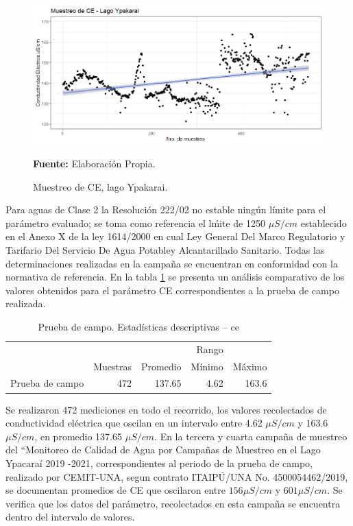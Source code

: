 \begin{figure}[H]
        \centering
        \includegraphics[width=0.75\linewidth]{Imagenes/cap4/CE_lago.png}
        \caption {Muestreo de CE, lago Ypakarai. }{\textbf{Fuente:}
        Elaboraci\'on Propia. }
        \label{fig:Lago_ce}
\end{figure}

Para aguas de Clase 2 la Resoluci\'on 222/02 no estable ningún l\'imite para el par\'ametro evaluado; se toma como referencia el l\'mite de 1250 $\mu S/cm$ establecido en el Anexo X de la ley 1614/2000 en cual Ley General Del Marco Regulatorio y Tarifario Del Servicio De Agua Potabley Alcantarillado Sanitario. Todas las determinaciones realizadas en la campa\~na se encuentran en conformidad con la normativa de referencia.
En la tabla \ref{table:Lago_ce} se presenta un an\'alisis comparativo de los valores obtenidos para el par\'ametro CE correspondientes a la prueba de campo  realizada.

\begin{table}[H]
\centering
\caption{Prueba de campo. Estadísticas descriptivas – ce}
\label{table:Lago_ce}
\begin{tabular}{lrrrr}
\toprule& 
\multicolumn{3}{r}{Rango} \\  \cline{4-5}& 
Muestras & Promedio & Mínimo & Máximo \\
\midrule
Prueba de campo  &      472 &   137.65 &   4.62 &  163.6 \\
\bottomrule
\end{tabular}
\end{table}

Se realizaron 472 mediciones en todo el recorrido, los valores recolectados de conductividad el\'ectrica que oscilan en  un intervalo entre 4.62 $\mu S/cm$ y 163.6 $\mu S/cm$, en promedio 137.65 $\mu S/cm$.
En la tercera \cite{3er_Cemit} y cuarta \cite{4to_Cemit} campaña de muestreo del “Monitoreo de Calidad de Agua por Campañas de Muestreo en el Lago Ypacaraí 2019 -2021, correspondientes al periodo de la prueba de campo, realizado por CEMIT-UNA, segun contrato ITAIPÚ/UNA No. 4500054462/2019, se documentan promedios de CE que oscilaron entre $156 \mu S/cm$ y $601 \mu S/cm$. 
Se verifica que los datos del par\'ametro, recolectados en esta campa\~na se encuentra dentro del intervalo de valores.

